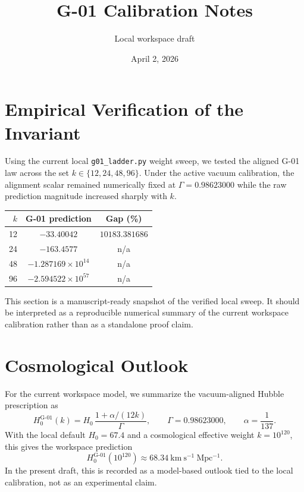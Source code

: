 \documentclass[11pt]{article}
\title{G-01 Calibration Notes}
\author{Local workspace draft}
\date{April 2, 2026}
\begin{document}
\maketitle

\section{Empirical Verification of the Invariant}
Using the current local \texttt{g01\_ladder.py} weight sweep, we tested the aligned G-01 law across the set $k \in \{12,24,48,96\}$. Under the active vacuum calibration, the alignment scalar remained numerically fixed at $\Gamma = 0.98623000$ while the raw prediction magnitude increased sharply with $k$.

\begin{center}
\begin{tabular}{rcc}
\toprule
$k$ & G-01 prediction & Gap (\%) \\
\midrule
12 & $-33.40042$ & $10183.381686$ \\
24 & $-163.4577$ & n/a \\
48 & $-1.287169 \times 10^{14}$ & n/a \\
96 & $-2.594522 \times 10^{57}$ & n/a \\
\bottomrule
\end{tabular}
\end{center}

This section is a manuscript-ready snapshot of the verified local sweep. It should be interpreted as a reproducible numerical summary of the current workspace calibration rather than as a standalone proof claim.

\section{Cosmological Outlook}
For the current workspace model, we summarize the vacuum-aligned Hubble prescription as
\[
H_0^{\mathrm{G\text{-}01}}(k) = H_0\,\frac{1 + \alpha/(12k)}{\Gamma},
\qquad
\Gamma = 0.98623000,
\qquad
\alpha = \frac{1}{137}.
\]
With the local default $H_0 = 67.4$ and a cosmological effective weight $k = 10^{120}$, this gives the workspace prediction
\[
H_0^{\mathrm{G\text{-}01}}(10^{120}) \approx 68.34\ \mathrm{km\ s^{-1}\ Mpc^{-1}}.
\]
In the present draft, this is recorded as a model-based outlook tied to the local calibration, not as an experimental claim.
\end{document}
